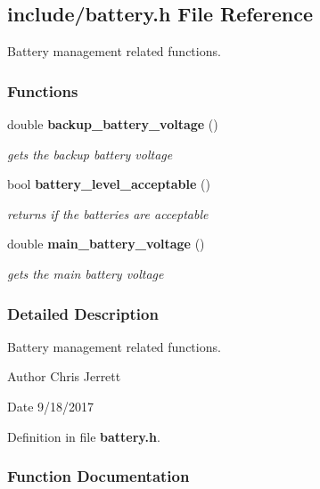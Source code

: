 \subsection{include/battery.h File Reference}
\label{battery_8h}


Battery management related functions.  


\subsubsection*{Functions}
\begin{DoxyCompactItemize}
\item 
double \textbf{ backup\+\_\+battery\+\_\+voltage} ()
\begin{DoxyCompactList}\small\item\em gets the backup battery voltage \end{DoxyCompactList}\item 
bool \textbf{ battery\+\_\+level\+\_\+acceptable} ()
\begin{DoxyCompactList}\small\item\em returns if the batteries are acceptable \end{DoxyCompactList}\item 
double \textbf{ main\+\_\+battery\+\_\+voltage} ()
\begin{DoxyCompactList}\small\item\em gets the main battery voltage \end{DoxyCompactList}\end{DoxyCompactItemize}


\subsubsection{Detailed Description}
Battery management related functions. 

\begin{DoxyAuthor}{Author}
Chris Jerrett 
\end{DoxyAuthor}
\begin{DoxyDate}{Date}
9/18/2017 
\end{DoxyDate}


Definition in file \textbf{ battery.\+h}.



\subsubsection{Function Documentation}
\mbox{\label{battery_8h_a9b1c5cf7ddddebf63796050a1d4a9969}} 
